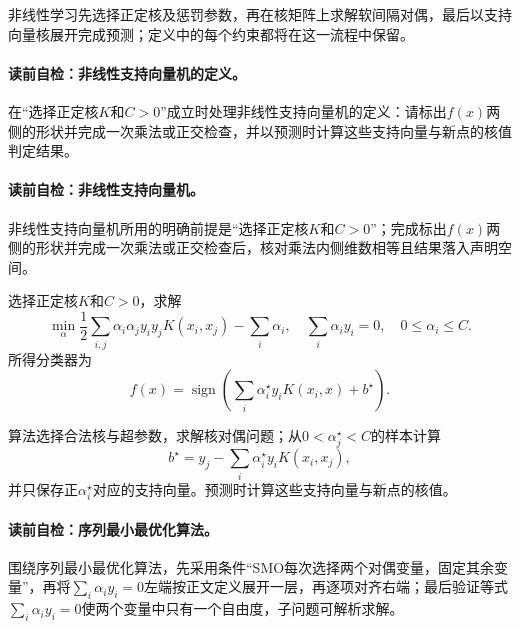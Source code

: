 非线性学习先选择正定核及惩罚参数，再在核矩阵上求解软间隔对偶，最后以支持向量核展开完成预测；定义中的每个约束都将在这一流程中保留。

\paragraph{读前自检：非线性支持向量机的定义。}在“选择正定核$K$和$C>0$”成立时处理非线性支持向量机的定义：请标出$f(x)$两侧的形状并完成一次乘法或正交检查，并以预测时计算这些支持向量与新点的核值判定结果。\par

\paragraph{读前自检：非线性支持向量机。}非线性支持向量机所用的明确前提是“选择正定核$K$和$C>0$”；完成标出$f(x)$两侧的形状并完成一次乘法或正交检查后，核对乘法内侧维数相等且结果落入声明空间。\par

\begin{definition}[非线性支持向量机]\label{def:V3-C02-nonlinear-svm}
选择正定核$K$和$C>0$，求解
\[
\min_\alpha\frac12\sum_{i,j}\alpha_i\alpha_jy_iy_jK(x_i,x_j)-\sum_i\alpha_i,
\quad
\sum_i\alpha_i y_i=0,\quad0\leq\alpha_i\leq C.
\]
所得分类器为
\[
f(x)=\operatorname{sign}\left(\sum_i\alpha_i^\star y_iK(x_i,x)+b^\star\right).
\]
\end{definition}

算法选择合法核与超参数，求解核对偶问题；从$0<\alpha_j^\star<C$的样本计算
\[
b^\star=y_j-\sum_i\alpha_i^\star y_iK(x_i,x_j),
\]
并只保存正$\alpha_i^\star$对应的支持向量。预测时计算这些支持向量与新点的核值。


\paragraph{读前自检：序列最小最优化算法。}围绕序列最小最优化算法，先采用条件“SMO每次选择两个对偶变量，固定其余变量”，再将$\sum_i\alpha_iy_i=0$左端按正文定义展开一层，再逐项对齐右端；最后验证等式$\sum_i\alpha_iy_i=0$使两个变量中只有一个自由度，子问题可解析求解。\par

